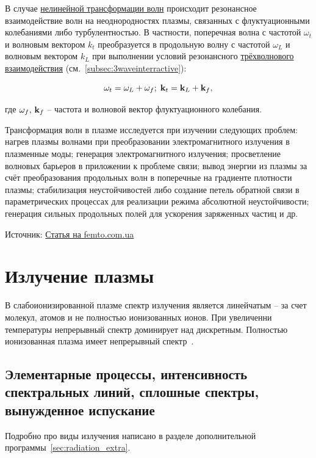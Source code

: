 \documentclass[10pt, a4paper]{article}
\let\stdsection\section
\renewcommand\section{\newpage\stdsection}
\begin{document}
В случае \uline{нелинейной трансформации волн} происходит резонансное взаимодействие волн на неоднородностях плазмы, связанных с флуктуационными колебаниями либо турбулентностью. В частности, поперечная волна с частотой $\omega_t$ и волновым вектором $k_t$ преобразуется в продольную волну с частотой $\omega_L$ и волновым вектором $k_L$ при выполнении условий резонансного \uline{трёхволнового взаимодействия} (см.~\ref{subsec:3waveinterractive}):

\begin{equation*}
	\omega_t = \omega_L + \omega_f;\;\vb{k}_t = \vb{k}_L+\vb{k}_f,
\end{equation*}

где $\omega_f,\,\vb{k}_f$ -- частота и волновой вектор флуктуационного колебания.

Трансформация волн в плазме исследуется при изучении следующих проблем: нагрев плазмы волнами при преобразовании электромагнитного излучения в плазменные моды; генерация электромагнитного излучения; просветление волновых барьеров в приложении к проблеме связи; вывод энергии из плазмы за счёт преобразования продольных волн в поперечные на градиенте плотности плазмы; стабилизация неустойчивостей либо создание петель обратной связи в параметрических процессах для реализации режима абсолютной неустойчивости; генерация сильных продольных полей для ускорения заряженных частиц и др.

Источник: \href{http://femto.com.ua/articles/part_2/4142.html}{Статья на femto.com.ua}

\section{Излучение плазмы} \label{sec:plasma_radiation}

В слабоионизированной плазме спектр излучения является линейчатым -- за счет молекул, атомов и не полностью ионизованных
ионов. При увеличенни температуры непрерывный спектр доминирует над дискретным. Полностью ионизованная плазма имеет
непрерывный спектр~\cite{kotelnikov}.

\subsection{Элементарные процессы, интенсивность спектральных линий, сплошные спектры, вынужденное испускание}

Подробно про виды излучения написано в разделе дополнительной программы~\ref{sec:radiation_extra}.
\end{document}
